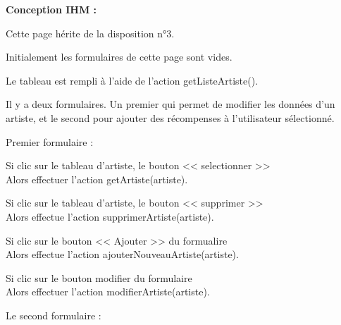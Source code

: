 			\begin{paragraphe}
				\textbf{Conception IHM :}
			\end{paragraphe}

			\begin{paragraphe}
				Cette page hérite de la disposition n°3. \par
				Initialement les formulaires de cette page sont vides.\par
				Le tableau est rempli à l'aide de l'action getListeArtiste().
			\end{paragraphe}


			\begin{paragraphe}
				Il y a deux formulaires. Un premier qui permet de modifier les données d'un artiste, et le second pour ajouter des récompenses à l'utilisateur sélectionné.
			\end{paragraphe}

			\begin{paragraphe}
				Premier formulaire :
			\end{paragraphe}

			\begin{paragraphe}
				Si clic sur le tableau d'artiste, le bouton << selectionner >> \\
				Alors effectuer l'action getArtiste(artiste).
			\end{paragraphe}

			\begin{paragraphe}
				Si clic sur le tableau d'artiste, le bouton << supprimer >> \\
				Alors effectue l'action supprimerArtiste(artiste).
			\end{paragraphe}

			\begin{paragraphe}
				Si clic sur le bouton << Ajouter >> du formualire \\
				Alors effectue l'action ajouterNouveauArtiste(artiste).
			\end{paragraphe}

			\begin{paragraphe}
				Si clic sur le bouton modifier du formulaire \\
				Alors effectuer l'action modifierArtiste(artiste).
			\end{paragraphe}

			\begin{paragraphe}
				Le second formulaire :
			\end{paragraphe}

